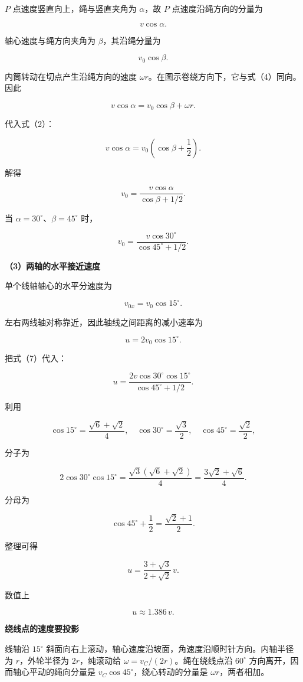 \documentclass[12pt,a4paper,UTF8]{ctexart}
\begin{document}
\(P\) 点速度竖直向上，绳与竖直夹角为 \(\alpha\)，故 \(P\)
点速度沿绳方向的分量为

\[
v\cos\alpha.
\tag{3}
\]

轴心速度与绳方向夹角为 \(\beta\)，其沿绳分量为

\[
v_0\cos\beta.
\tag{4}
\]

内筒转动在切点产生沿绳方向的速度
\(\omega r\)。在图示卷绕方向下，它与式（4）同向。因此

\[
v\cos\alpha=v_0\cos\beta+\omega r.
\tag{5}
\]

代入式（2）：

\[
v\cos\alpha
=v_0\left(\cos\beta+\frac12\right).
\]

解得

\[
v_0
=\frac{v\cos\alpha}{\cos\beta+1/2}.
\tag{6}
\]

当 \(\alpha=30^\circ\)、\(\beta=45^\circ\) 时，

\[
v_0
=\frac{v\cos30^\circ}{\cos45^\circ+1/2}.
\tag{7}
\]

\textbf{（3）两轴的水平接近速度}

单个线轴轴心的水平分速度为

\[
v_{0x}=v_0\cos15^\circ.
\]

左右两线轴对称靠近，因此轴线之间距离的减小速率为

\[
u=2v_0\cos15^\circ.
\tag{8}
\]

把式（7）代入：

\[
u
=\frac{2v\cos30^\circ\cos15^\circ}
{\cos45^\circ+1/2}.
\tag{9}
\]

利用

\[
\cos15^\circ=\frac{\sqrt6+\sqrt2}{4},
\quad
\cos30^\circ=\frac{\sqrt3}{2},
\quad
\cos45^\circ=\frac{\sqrt2}{2},
\]

分子为

\[
2\cos30^\circ\cos15^\circ
=\frac{\sqrt3(\sqrt6+\sqrt2)}4
=\frac{3\sqrt2+\sqrt6}{4}.
\]

分母为

\[
\cos45^\circ+\frac12
=\frac{\sqrt2+1}{2}.
\]

整理可得

\[
\boxed{
u=\frac{3+\sqrt3}{2+\sqrt2}\,v
}.
\tag{10}
\]

数值上

\[
\boxed{u\approx1.386\,v}.
\]

\textbf{绕线点的速度要投影}

线轴沿 \(15^\circ\)
斜面向右上滚动，轴心速度沿坡面，角速度沿顺时针方向。内轴半径为
\(r\)，外轮半径为 \(2r\)，纯滚动给 \(\omega=v_C/(2r)\)。绳在绕线点沿
\(60^\circ\) 方向离开，因而轴心平动的绳向分量是
\(v_C\cos45^\circ\)，绕心转动的分量是 \(\omega r\)，两者相加。
\end{document}
